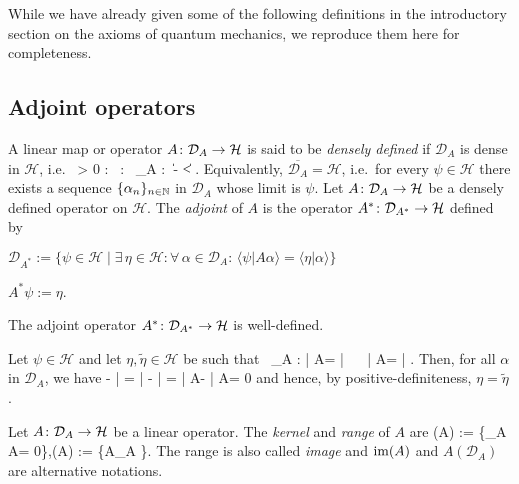 

While we have already given some of the following definitions in the introductory section on the axioms of quantum mechanics, we reproduce them here for completeness. 

\subsection{Adjoint operators}

\bd
A linear map or operator $A\colon\mathcal{D}_A\to\mathcal{H}$ is said to be \emph{densely defined} if $\mathcal{D}_A$ is dense in $\mathcal{H}$, i.e.
\bse
\forall \, \varepsilon > 0 : \forall \, \psi\in {} : \exists \, \alpha \in {}_A : \ \|\alpha - \psi\|< \varepsilon.
\ese
\ed
Equivalently, $\overline{\mathcal{D}_A}=\mathcal{H}$, i.e.\ for every $\psi\in\mathcal{H}$ there exists a sequence $\{\alpha_n\}_{n\in\mathbb{N}}$ in $\mathcal{D}_A$ whose limit is $\psi$.
\bd
Let $A\colon \mathcal{D}_A\to \mathcal{H}$ be a densely defined operator on $\mathcal{H}$. The \emph{adjoint} of $A$ is the operator $A^*\colon\mathcal{D}_{A^*}\to\mathcal{H}$ defined by
\ben[label=(\roman*)]
\item $\mathcal{D}_{A^*}:=\{\psi\in\mathcal{H} \mid \exists \, \eta\in \mathcal{H} : \forall \, \alpha \in \mathcal{D}_A : \, \langle \psi | A\alpha \rangle = \langle \eta | \alpha \rangle\}$
\item $A^*\psi:=\eta$.
\een
\ed

\bp
The adjoint operator $A^*\colon\mathcal{D}_{A^*}\to\mathcal{H}$ is well-defined.
\ep

\bq
Let $\psi\in \mathcal{H}$ and let $\eta,\widetilde\eta \in \mathcal{H}$ be such that
\bse
\forall \, \alpha\in {}_A : \quad \langle \psi | A\alpha \rangle = \langle \eta | \alpha \rangle \  \ \langle \psi | A\alpha \rangle = \langle \widetilde \eta | \alpha \rangle.
\ese
Then, for all $\alpha$ in $\mathcal{D}_A$, we have
\bse
\langle \eta - \widetilde \eta | \alpha \rangle
 =  \langle  \eta | \alpha \rangle - \langle \widetilde \eta | \alpha \rangle  =    \langle \psi | A\alpha \rangle- \langle \psi | A\alpha \rangle  =  0
\ese
and hence, by positive-definiteness, $\eta = \widetilde \eta$.
\eq

\bd
Let $A\colon \mathcal{D}_A\to \mathcal{H}$ be a linear operator. The \emph{kernel} and \emph{range} of $A$ are
\bse
\ker (A)  :=  \{\alpha \in {}_A \mid A\alpha = 0\},\quad\qquad\ran (A)  :=  \{A\alpha \mid \alpha \in {}_A \}.
\ese
The range is also called \emph{image} and $\operatorname{im} (A)$ and $A(\mathcal{D}_A)$ are alternative notations.
\ed

